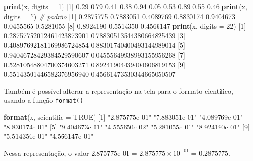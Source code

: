 \documentclass[10pt,a4paper]{book}
\newenvironment{Shaded}{\begin{snugshade}}{\end{snugshade}}
\newcommand{\KeywordTok}[1]{\textcolor[rgb]{0.13,0.29,0.53}{\textbf{#1}}}
\newcommand{\DataTypeTok}[1]{\textcolor[rgb]{0.13,0.29,0.53}{#1}}
\newcommand{\DecValTok}[1]{\textcolor[rgb]{0.00,0.00,0.81}{#1}}
\newcommand{\FloatTok}[1]{\textcolor[rgb]{0.00,0.00,0.81}{#1}}
\newcommand{\StringTok}[1]{\textcolor[rgb]{0.31,0.60,0.02}{#1}}
\newcommand{\CommentTok}[1]{\textcolor[rgb]{0.56,0.35,0.01}{\textit{#1}}}
\newcommand{\OtherTok}[1]{\textcolor[rgb]{0.56,0.35,0.01}{#1}}
\newcommand{\NormalTok}[1]{#1}
\begin{document}
\begin{Shaded}
\begin{Highlighting}[]
\KeywordTok{print}\NormalTok{(x, }\DataTypeTok{digits =} \DecValTok{1}\NormalTok{)}
\NormalTok{ [}\DecValTok{1}\NormalTok{] }\FloatTok{0.29} \FloatTok{0.79} \FloatTok{0.41} \FloatTok{0.88} \FloatTok{0.94} \FloatTok{0.05} \FloatTok{0.53} \FloatTok{0.89} \FloatTok{0.55} \FloatTok{0.46}
\KeywordTok{print}\NormalTok{(x, }\DataTypeTok{digits =} \DecValTok{7}\NormalTok{) }\CommentTok{# padrão}
\NormalTok{ [}\DecValTok{1}\NormalTok{] }\FloatTok{0.2875775} \FloatTok{0.7883051} \FloatTok{0.4089769} \FloatTok{0.8830174} \FloatTok{0.9404673} \FloatTok{0.0455565} \FloatTok{0.5281055}
\NormalTok{ [}\DecValTok{8}\NormalTok{] }\FloatTok{0.8924190} \FloatTok{0.5514350} \FloatTok{0.4566147}
\KeywordTok{print}\NormalTok{(x, }\DataTypeTok{digits =} \DecValTok{22}\NormalTok{)}
\NormalTok{ [}\DecValTok{1}\NormalTok{] }\FloatTok{0.28757752012461423873901} \FloatTok{0.78830513544380664825439}
\NormalTok{ [}\DecValTok{3}\NormalTok{] }\FloatTok{0.40897692181169986724854} \FloatTok{0.88301740400493144989014}
\NormalTok{ [}\DecValTok{5}\NormalTok{] }\FloatTok{0.94046728429384529590607} \FloatTok{0.04555649938993155956268}
\NormalTok{ [}\DecValTok{7}\NormalTok{] }\FloatTok{0.52810548804700374603271} \FloatTok{0.89241904439404606819153}
\NormalTok{ [}\DecValTok{9}\NormalTok{] }\FloatTok{0.55143501446582376956940} \FloatTok{0.45661473530344665050507}
\end{Highlighting}
\end{Shaded}

Também é possível alterar a representação na tela para o formato
científico, usando a função \texttt{format()}

\begin{Shaded}
\begin{Highlighting}[]
\KeywordTok{format}\NormalTok{(x, }\DataTypeTok{scientific =} \OtherTok{TRUE}\NormalTok{)}
\NormalTok{ [}\DecValTok{1}\NormalTok{] }\StringTok{"2.875775e-01"} \StringTok{"7.883051e-01"} \StringTok{"4.089769e-01"} \StringTok{"8.830174e-01"}
\NormalTok{ [}\DecValTok{5}\NormalTok{] }\StringTok{"9.404673e-01"} \StringTok{"4.555650e-02"} \StringTok{"5.281055e-01"} \StringTok{"8.924190e-01"}
\NormalTok{ [}\DecValTok{9}\NormalTok{] }\StringTok{"5.514350e-01"} \StringTok{"4.566147e-01"}
\end{Highlighting}
\end{Shaded}

Nessa representação, o valor 2.875775e-01 = \(2.875775 \times 10^{-01}\)
= \(0.2875775\).
\end{document}
